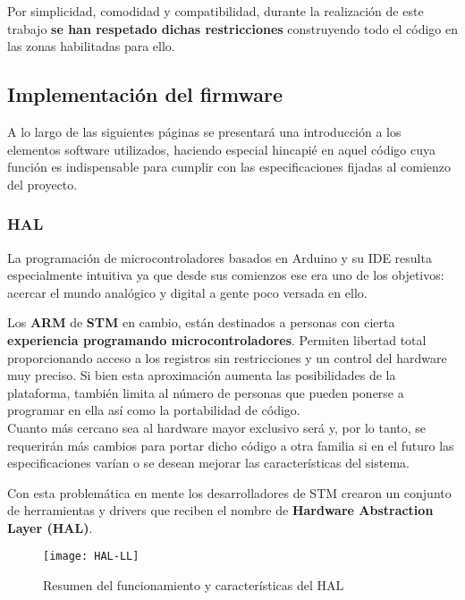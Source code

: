 Por simplicidad, comodidad y compatibilidad, durante la realización de este trabajo \textbf{se han respetado dichas restricciones} construyendo todo el código en las zonas habilitadas para ello.

\clearpage

\subsection{Implementación del firmware \label{sec:Software_micro_HAL}}

A lo largo de las siguientes páginas se presentará una introducción a los elementos software utilizados, haciendo especial hincapié en aquel código cuya función es indispensable para cumplir con las especificaciones fijadas al comienzo del proyecto.

\subsubsection{HAL \label{sec:Software_micro_HAL}}

La programación de microcontroladores basados en Arduino y su \acrshort{IDE} resulta especialmente intuitiva ya que desde sus comienzos ese era uno de los objetivos: acercar el mundo analógico y digital a gente poco versada en ello.

Los \textbf{ARM} de \textbf{STM} en cambio, están destinados a personas con cierta \textbf{experiencia programando microcontroladores}. Permiten libertad total proporcionando acceso a los registros sin restricciones y un control del hardware muy preciso. Si bien esta aproximación aumenta las posibilidades de la plataforma, también limita al número de personas que pueden ponerse a programar en ella así como la portabilidad de código.
\\Cuanto más cercano sea al hardware mayor exclusivo será y, por lo tanto, se requerirán más cambios para portar dicho código a otra familia si en el futuro las especificaciones varían o se desean mejorar las características del sistema.

Con esta problemática en mente los desarrolladores de STM crearon un conjunto de herramientas y drivers que reciben el nombre de \textbf{Hardware Abstraction Layer (\acrshort{HAL})}.

\begin{figure} [h]
    \centering
    \texttt{[image: HAL-LL]}
    \caption{Resumen del funcionamiento y características del HAL \cite{HAL-LL}}
    \label{fig:HAL-LL}
\end{figure}

